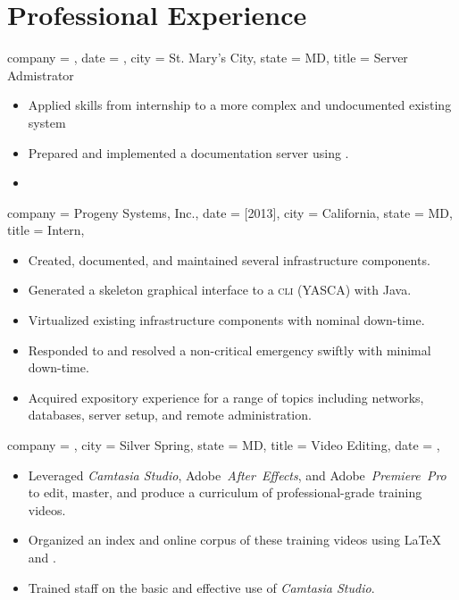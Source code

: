 \documentclass{bettercv}
\newcommand \software[1] {\textsl{#1}}
\begin{document}
\section{Professional Experience}

\begin{position}
  {
    company = \smcmmathcs,
    date    = ,
    city    = St. Mary's City,
    state   = MD,
    title   = Server Admistrator
  }

\begin{itemize}
\item Applied skills from internship to a more complex and undocumented existing system
\item Prepared and implemented a documentation server using \redmine.
\item {}
\end{itemize}
\end{position}

\begin{position}
  {
    company = {Progeny Systems, Inc.},
    date    = [2013],
    city    = California,
    state   = MD,
    title   = Intern,
  }

\begin{itemize}
\item Created, documented, and maintained several infrastructure components.
\item Generated a skeleton graphical interface to a \textsc{cli} (YASCA) with Java.
\item Virtualized existing infrastructure components with nominal down-time.
\item Responded to and resolved a non-critical emergency swiftly with minimal down-time.
\item Acquired expository experience for a range of topics including
  networks,
  databases,
  server setup, and
  remote administration.
\end{itemize}
\end{position}

\begin{position}
  {
    company = \cwc,
    city    = Silver Spring,
    state   = MD,
    title   = Video Editing,
    date    = ,
  }

\begin{itemize}
\item Leveraged \software{Camtasia Studio},
  Adobe~\software{After~Effects}, and
  Adobe~\software{Premiere~Pro} to edit, master, and produce
  a curriculum of professional-grade training videos.
\item Organized an index and online corpus of these training videos using \LaTeX{} and \mindflash.
\item Trained staff on the basic and effective use of \software{Camtasia Studio}.
\end{itemize}
\end{position}
\end{document}
